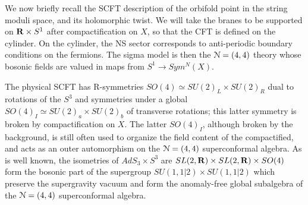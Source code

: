\documentclass[../main.tex]{subfiles}
\begin{document}
We now briefly recall the SCFT description of the orbifold point in the string moduli space, and its holomorphic twist. We will take the branes to be supported on $\mathbf{R} \times S^1$ after compactification on $X$, so that the CFT is defined on the cylinder. On the cylinder, the NS sector corresponds to anti-periodic boundary conditions on the fermions. The sigma model is then the $\mathcal N = (4,4)$ theory whose bosonic fields are valued in maps from $S^1 \rightarrow Sym^N(X)$.  

The physical SCFT has R-symmetries $SO(4) \simeq SU(2)_L \times SU(2)_R$ dual to rotations of the $S^3$ and symmetries under a global $SO(4)_I \simeq SU(2)_a \times SU(2)_b$ of transverse rotations; this latter symmetry is broken by compactification on $X$. The latter $SO(4)_I$, although broken by the background, is still often used to organize the field content of the compactified, and acts as an outer automorphism on the $\mathcal N=(4, 4)$ superconformal algebra. As is well known, the isometries of $AdS_3 \times S^3$ are $SL(2, \mathbf{R}) \times SL(2, \mathbf{R}) \times SO(4)$ form the bosonic part of the supergroup $SU(1,1|2) \times SU(1,1|2)$ which preserve the supergravity vacuum and form the anomaly-free global subalgebra of the $\mathcal N= (4,4)$ superconformal algebra.

\end{document}
